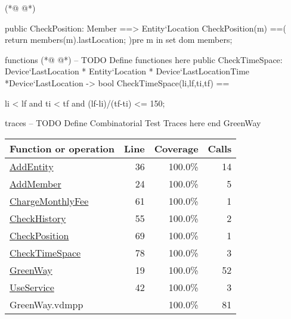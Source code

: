 \begin{vdmpp}
(*@
\label{CheckPosition:69}
@*)
 
 public CheckPosition: Member ==>  Entity`Location
 CheckPosition(m) ==(
    return members(m).lastLocation;
    )pre m in set dom members;
    
 

functions
(*@
\label{CheckTimeSpace:78}
@*)
-- TODO Define functiones here
 public CheckTimeSpace: Device`LastLocation * Entity`Location * Device`LastLocationTime *Device`LastLocation  -> bool  
  CheckTimeSpace(li,lf,ti,tf) ==
 
  li < lf and ti < tf and (lf-li)/(tf-ti) <= 150;
  
traces
-- TODO Define Combinatorial Test Traces here
end GreenWay
\end{vdmpp}
\bigskip
\begin{longtable}{|l|r|r|r|}
\hline
Function or operation & Line & Coverage & Calls \\
\hline
\hline
\hyperref[AddEntity:36]{AddEntity} & 36&100.0\% & 14 \\
\hline
\hyperref[AddMember:24]{AddMember} & 24&100.0\% & 5 \\
\hline
\hyperref[ChargeMonthlyFee:61]{ChargeMonthlyFee} & 61&100.0\% & 1 \\
\hline
\hyperref[CheckHistory:55]{CheckHistory} & 55&100.0\% & 2 \\
\hline
\hyperref[CheckPosition:69]{CheckPosition} & 69&100.0\% & 1 \\
\hline
\hyperref[CheckTimeSpace:78]{CheckTimeSpace} & 78&100.0\% & 3 \\
\hline
\hyperref[GreenWay:19]{GreenWay} & 19&100.0\% & 52 \\
\hline
\hyperref[UseService:42]{UseService} & 42&100.0\% & 3 \\
\hline
\hline
GreenWay.vdmpp & & 100.0\% & 81 \\
\hline
\end{longtable}

